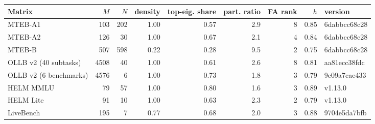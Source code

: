 \begin{tabular}{@{}lrrrrrrrl@{}}
\toprule
Matrix & $M$ & $N$ & density & top-eig. share & part. ratio & FA rank & $h$ & version \\
\midrule
MTEB-A1 & 103 & 202 & 1.00 & 0.57 & 2.9 & 8 & 0.85 & 6dabbcc68c28 \\
MTEB-A2 & 126 & 30 & 1.00 & 0.67 & 2.1 & 4 & 0.84 & 6dabbcc68c28 \\
MTEB-B & 507 & 598 & 0.22 & 0.28 & 9.5 & 2 & 0.75 & 6dabbcc68c28 \\
OLLB v2 (40 subtasks) & 4508 & 40 & 1.00 & 0.61 & 2.6 & 8 & 0.81 & aa81ecc38fdc \\
OLLB v2 (6 benchmarks) & 4576 & 6 & 1.00 & 0.73 & 1.8 & 3 & 0.79 & 9c09a7cae433 \\
HELM MMLU & 79 & 57 & 1.00 & 0.80 & 1.6 & 3 & 0.89 & v1.13.0 \\
HELM Lite & 91 & 10 & 1.00 & 0.63 & 2.3 & 2 & 0.79 & v1.13.0 \\
LiveBench & 195 & 7 & 0.77 & 0.68 & 2.0 & 3 & 0.88 & 9704e5da7bfb \\
\bottomrule
\end{tabular}
